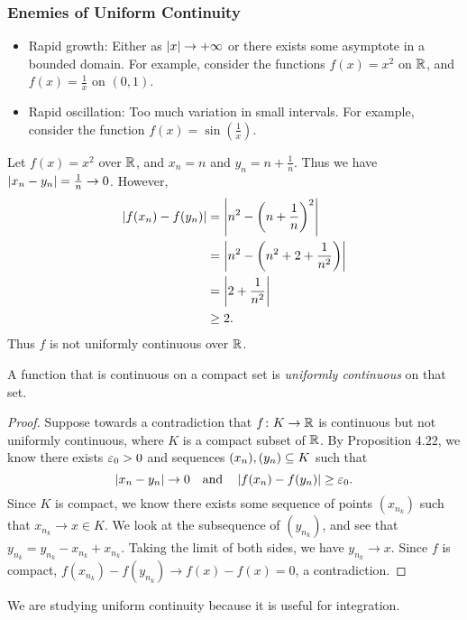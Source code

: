\documentclass[class=article, crop=false]{standalone}
\begin{document}
  \subsubsection{Enemies of Uniform Continuity}
  \begin{itemize}
    \item Rapid growth: Either as $\left\lvert x \right\rvert\to+\infty$ or there exists some asymptote in a bounded domain. For example, consider the functions $f(x) = x^2$ on $\mathbb{R}$, and $f(x) = \frac{1}{x}$ on $(0, 1)$.
    \item Rapid oscillation: Too much variation in small intervals. For example, consider the function $f(x) = \sin(\frac{1}{x})$.
  \end{itemize}
  \begin{example}{}
    Let $f(x) = x^2$ over $\mathbb{R}$, and $x_n = n$ and $y_n = n + \frac{1}{n}$. Thus we have $\left\lvert x_n - y_n \right\rvert = \frac{1}{n}\to 0$. However,
    \begin{align*}
      \left\lvert f(x_n) - f(y_n) \right\rvert &= \left\lvert n^2 - \left( n + \frac{1}{n} \right)^2 \right\rvert \\
                            &= \left\lvert n^2 - \left( n^2 + 2 + \frac{1}{n^2} \right) \right\rvert \\
                            &= \left\lvert 2 + \frac{1}{n^2} \right\rvert \\
                            &\geq 2.
    \end{align*}
    Thus $f$ is not uniformly continuous over $\mathbb{R}$.
  \end{example}
  \begin{theorem}{4.23}
    A function that is continuous on a compact set is \emph{uniformly continuous} on that set.
    \begin{proof}
      Suppose towards a contradiction that $f\colon K\to \mathbb{R}$ is continuous but not uniformly continuous, where $K$ is a compact subset of $\mathbb{R}$. By Proposition $4.22$, we know there exists $\varepsilon_0 > 0$ and sequences $(x_n), (y_n)\subseteq K$ such that
      \[
        \left\lvert x_n - y_n \right\rvert\to 0 \quad\text{and}\quad \left\lvert f(x_n)-f(y_n) \right\rvert\geq \varepsilon_0.
      \]
      Since $K$ is compact, we know there exists some sequence of points $(x_{n_k})$ such that $x_{n_k}\to x\in K$. We look at the subsequence of $(y_{n_k})$, and see that $y_{n_k} =y_{n_k} - x_{n_k} + x_{n_k}$. Taking the limit of both sides, we have $y_{n_k}\to x$. Since $f$ is compact, $f(x_{n_k}) - f(y_{n_k})\to f(x) - f(x) = 0$, a contradiction.
    \end{proof}
  \end{theorem}
  We are studying uniform continuity because it is useful for integration.
\end{document}
